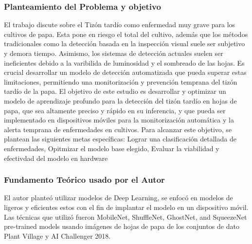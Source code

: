 \subsubsection{Planteamiento del Problema y objetivo }
El trabajo discute sobre el Tizón tardío como enfermedad muy grave para los cultivos de papa. Esta pone en riesgo el total del cultivo, además que los métodos tradicionales como la detección basada en la inspección visual suele ser subjetivo y demora tiempo. Asimismo, los sistemas de detección actuales suelen ser ineficientes debido a la varibilida de luminosidad y el sombreado de las hojas. Es crucial desarrollar un modelo de detección automatizada que pueda superar estas limitaciones, permitiendo una monitorización y prevención temprana del tizón tardío de la papa. El objetivo de este estudio es desarrollar y optimizar un modelo de aprendizaje profundo para la detección del tizón tardío en hojas de papa, que sea altamente preciso y rápido en su inferencia, y que pueda ser implementado en dispositivos móviles para la monitorización automática y la alerta temprana de enfermedades en cultivos. Para alcanzar este objetivo, se plantean las siguientes metas específicas: Lograr una clasificación detallada de enfermedades, Opitmizar el modelo base elegido, Evaluar la viabilidad y efectivdad del modelo en hardware

\subsubsection{Fundamento Teórico usado por el Autor}

El autor planteó utilizar modelos de Deep Learning, se enfocó en modelos de ligeros y eficientes estos con el fin de implantar el modelo en un dispositivo móvil. Las técnicas que utilizó fueron MobileNet, ShuffleNet, GhostNet, and SqueezeNet pre-trained models usando imágenes de hojas de papa de los conjuntos de dato Plant Village y AI Challenger 2018. 


